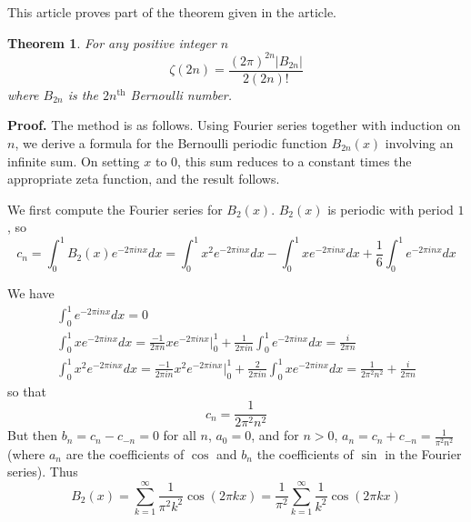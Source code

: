 \documentclass[12pt]{article}
\newtheorem{thm}{Theorem}
\begin{document}
This article proves part of the theorem given in the  article.
\begin{thm} For any positive integer $n$
\[\zeta(2n)=\frac{(2\pi)^{2n}\lvert B_{2n}\rvert}{2(2n)!}\]
where $B_{2n}$ is the $2n^{\mathrm{th}}$ Bernoulli number.
\end{thm}

\textbf{Proof.}
The method is as follows. Using Fourier series together with induction on $n$, we derive a formula for the Bernoulli periodic function $B_{2n}(x)$ involving an infinite sum. On setting $x$ to $0$, this sum reduces to a constant times the appropriate zeta function, and the result follows.

We first compute the Fourier series for $B_2(x)$. $B_2(x)$ is periodic with period $1$, so
\[c_n=\int_0^1B_2(x)e^{-2\pi i n x}dx = \int_0^1x^2e^{-2\pi i n x}dx - \int_0^1 xe^{-2\pi i n x}dx + \frac{1}{6}\int_0^1 e^{-2\pi i n x}dx\]

We have
\begin{gather*}
\int_0^1 e^{-2\pi i n x}dx=0\\
\int_0^1 xe^{-2\pi i n x}dx = \frac{-1}{2\pi n}xe^{-2\pi i n x}\big\lvert_0^1 + \frac{1}{2\pi i n}\int_0^1e^{-2\pi i n x}dx = \frac{i}{2\pi n}\\
\int_0^1 x^2e^{-2\pi i n x} dx = \frac{-1}{2\pi i n}x^2e^{-2\pi i n x}\big\lvert_0^1 + \frac{2}{2\pi i n}\int_0^1 xe^{-2\pi i n x}dx = \frac{1}{2\pi^2n^2}+\frac{i}{2\pi n}
\end{gather*}
so that
\[c_n = \frac{1}{2\pi^2n^2}\]
But then $b_n=c_n-c_{-n}=0$ for all $n$, $a_0=0$, and for $n>0$, $\displaystyle a_n=c_n+c_{-n}=\frac{1}{\pi^2n^2}$ (where $a_n$ are the coefficients of $\cos$ and $b_n$ the coefficients of $\sin$ in the Fourier series). Thus
\[B_2(x)=\sum_{k=1}^{\infty}\frac{1}{\pi^2k^2}\cos(2\pi k x)=\frac{1}{\pi^2}\sum_{k=1}^{\infty}\frac{1}{k^2}\cos(2\pi k x)\]
\end{document}
